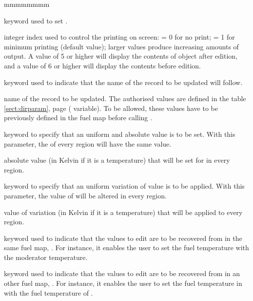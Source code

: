 \begin{ListeDeDescription}{mmmmmmmm}

\item[\moc{EDIT}] keyword used to set .

\item[\dusa{iprint}] integer index used to control the printing on screen:
 = 0 for no print; = 1 for minimum printing (default value); larger values
produce increasing amounts of output. A value of 5 or higher will display 
the contents of  object after edition, and a value of 6 or higher
will display the contents before edition.

\item[\moc{REC}] keyword used to indicate that the name of the record to be
updated will follow.

\item[\dusa{rec1}] name of the record to be updated. The authorised values are
defined in the table \ref{sect:dirparam}, page \pageref{sect:dirparam} (
variable). To be allowed, these values have to be previously defined in the fuel
map before calling .

\item[\moc{UNI}] keyword to specify that an uniform and absolute value
is to be set. With this parameter, the  of every region will have
the same value.

\item[\dusa{value1}] absolute value (in Kelvin if it is a temperature) that will
be set for  in every region.

\item[\moc{ADD}] keyword to specify that an uniform variation of  value
is to be applied. With this parameter, the value of  will be altered in
every region.

\item[\dusa{value2}] value of  variation (in Kelvin if it is a
temperature) that will be applied to every region.

\item[\moc{SAME}] keyword used to indicate that the values to edit  are
to be recovered from  in the same fuel map, . For instance,
it enables the user to set the fuel temperature with the moderator temperature.

\item[\moc{READ}] keyword used to indicate that the values to edit  are
to be recovered from  in an other fuel map, . For instance,
it enables the user to set the fuel temperature in  with the fuel
temperature of .


\end{ListeDeDescription}

